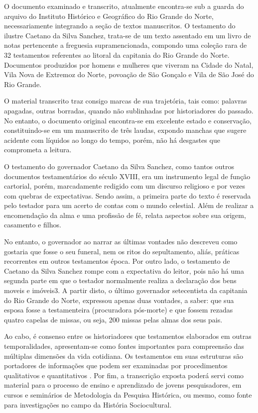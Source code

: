 \begin{refsection}
    O documento examinado e transcrito, atualmente encontra-se sub a guarda do arquivo do Instituto Histórico e Geográfico do Rio Grande do Norte, necessariamente integrando a seção de textos manuscritos. O testamento do ilustre Caetano da Silva Sanchez, trata-se de um texto assentado em um livro de notas pertencente a freguesia supramencionada, compondo uma coleção rara de 32 testamentos referentes ao litoral da capitania do Rio Grande do Norte. Documentos produzidos por homens e mulheres que viveram na Cidade do Natal, Vila Nova de Extremoz do Norte, povoação de São Gonçalo e Vila de São José do Rio Grande.  

    O material transcrito traz consigo marcas de sua trajetória, tais como: palavras apagadas, outras borradas, quando não sublinhadas por historiadores do passado. No entanto, o documento original encontra-se em excelente estado e conservação, constituindo-se em um manuscrito de três laudas, expondo manchas que sugere acidente com líquidos ao longo do tempo, porém, não há desgastes que comprometa a leitura. 

    O testamento do governador Caetano da Silva Sanchez, como tantos outros documentos testamentários do século XVIII, era um instrumento legal de função cartorial, porém, marcadamente redigido com um discurso religioso e por vezes com quebras de expectativas. Sendo assim, a primeira parte do texto é reservada pelo testador para um acerto de contas com o mundo celestial. Além de realizar a encomendação da alma e uma profissão de fé, relata aspectos sobre sua origem, casamento e filhos.  

    No entanto, o governador ao narrar as últimas vontades não descreveu como gostaria que fosse o seu funeral, nem os ritos do sepultamento, aliás, práticas recorrentes em outros testamentos época. Por outro lado, o testamento de Caetano da Silva Sanchez rompe com a expectativa do leitor, pois não há uma segunda parte em que o testador normalmente realiza a declaração dos bens moveis e imóveis3. A partir disto, o último governador setecentista da capitania do Rio Grande do Norte, expressou apenas duas vontades, a saber: que sua esposa fosse a testamenteira (procuradora pós-morte) e que fossem rezadas quatro capelas de missas, ou seja, 200 missas pelas almas dos seus pais.      

    Ao cabo, é consenso entre os historiadores que testamentos elaborados em outras temporalidades, apresentam-se como fontes importantes para compreensão das múltiplas dimensões da vida cotidiana. Os testamentos em suas estruturas são portadores de informações que podem ser examinadas por procedimentos qualitativos e quantitativos \cites{Marcilio1983Morte}{RodriguesAndDillmann2013Desejando}{Santos2013Historia}. Por fim, a transcrição exposta poderá servi como material para o processo de ensino e aprendizado de jovens pesquisadores, em cursos e seminários de Metodologia da Pesquisa Histórica, ou mesmo, como fonte para investigações no campo da História Sociocultural.


\end{refsection}
